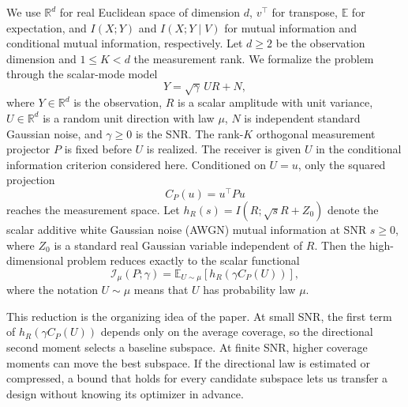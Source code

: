 \documentclass[lettersize,onecolumn]{IEEEtran}
\theoremstyle{remark}
\theoremstyle{definition}
\newcommand{\R}{\mathbb R}
\newcommand{\EE}{\mathbb E}
\newcommand{\I}{\mathcal I}
\begin{document}
We use $\R^d$ for real Euclidean space of dimension $d$, $v^{\top}$ for transpose, $\EE$ for expectation, and $I(X;Y)$ and $I(X;Y\mid V)$ for mutual information and conditional mutual information, respectively. Let $d\ge2$ be the observation dimension and $1\le K<d$ the measurement rank. We formalize the problem through the scalar-mode model
\begin{equation}
Y=\sqrt{\gamma}\,UR+N,
\label{eq:intro_model}
\end{equation}
where $Y\in\R^d$ is the observation, $R$ is a scalar amplitude with unit variance, $U\in\R^d$ is a random unit direction with law $\mu$, $N$ is independent standard Gaussian noise, and $\gamma\ge0$ is the SNR. The rank-$K$ orthogonal measurement projector $P$ is fixed before $U$ is realized. The receiver is given $U$ in the conditional information criterion considered here. Conditioned on $U=u$, only the squared projection
\begin{equation}
C_P(u)=u^{\top}Pu
\end{equation}
reaches the measurement space. Let $h_R(s)=I(R;\sqrt{s}R+Z_0)$ denote the scalar additive white Gaussian
noise (AWGN) mutual information at SNR $s\ge0$, where $Z_0$ is a standard
real Gaussian variable independent of $R$. Then the high-dimensional problem
reduces exactly to the scalar functional
\begin{equation}
\I_\mu(P;\gamma)=\EE_{U\sim\mu}\!\left[h_R\!\left(\gamma C_P(U)\right)\right],
\label{eq:intro_functional}
\end{equation}
where the notation $U\sim\mu$ means that $U$ has probability law $\mu$.

This reduction is the organizing idea of the paper. At small SNR, the first
term of $h_R(\gamma C_P(U))$ depends only on the average coverage, so the
directional second moment selects a baseline subspace. At finite SNR,
higher coverage moments can move the best subspace. If the directional law
is estimated or compressed, a bound that holds for every candidate subspace
lets us transfer a design without knowing its optimizer in advance.
\end{document}
